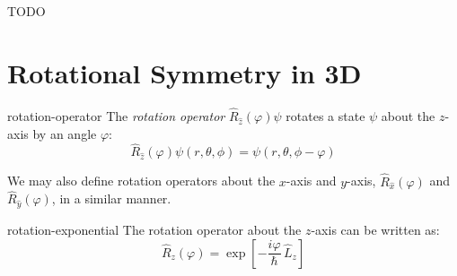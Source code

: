 \documentclass[12pt]{article}
\begin{document}
TODO 

\section{Rotational Symmetry in 3D}

\begin{dfn}{rotation-operator}
  The \emph{rotation operator} $\hat{R}_{\hat{z}}(\varphi)\psi$ rotates a state $\psi$ about the $z$-axis by an angle $\varphi$:
  \[\hat{R}_{\hat{z}}(\varphi)\psi(r, \theta, \phi) = \psi(r, \theta, \phi - \varphi)\] 
\end{dfn}

\begin{rem}
  We may also define rotation operators about the $x$-axis and $y$-axis, $\hat{R}_{\hat{x}}(\varphi)$ and $\hat{R}_{\hat{y}}(\varphi)$, in a similar manner. 
\end{rem}

\begin{thm}{rotation-exponential}
  The rotation operator about the $z$-axis can be written as:
  \[\hat{R}_z(\varphi) = \exp\!\left[-\frac{i\varphi}{\hbar}\,\hat{L}_z\right]\] 
\end{thm} 
\end{document}
